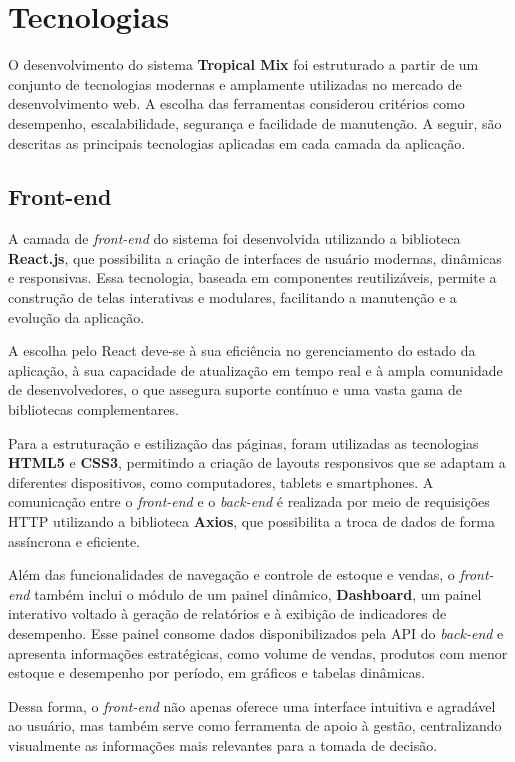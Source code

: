 \section{Tecnologias}

O desenvolvimento do sistema \textbf{Tropical Mix} foi estruturado a partir de um conjunto de tecnologias modernas e amplamente utilizadas no mercado de desenvolvimento web. A escolha das ferramentas considerou critérios como desempenho, escalabilidade, segurança e facilidade de manutenção. A seguir, são descritas as principais tecnologias aplicadas em cada camada da aplicação.

\subsection{Front-end}

A camada de \textit{front-end} do sistema foi desenvolvida utilizando a biblioteca \textbf{React.js}, que possibilita a criação de interfaces de usuário modernas, dinâmicas e responsivas. Essa tecnologia, baseada em componentes reutilizáveis, permite a construção de telas interativas e modulares, facilitando a manutenção e a evolução da aplicação.  

A escolha pelo React deve-se à sua eficiência no gerenciamento do estado da aplicação, à sua capacidade de atualização em tempo real e à ampla comunidade de desenvolvedores, o que assegura suporte contínuo e uma vasta gama de bibliotecas complementares.  

Para a estruturação e estilização das páginas, foram utilizadas as tecnologias \textbf{HTML5} e \textbf{CSS3}, permitindo a criação de layouts responsivos que se adaptam a diferentes dispositivos, como computadores, tablets e smartphones. A comunicação entre o \textit{front-end} e o \textit{back-end} é realizada por meio de requisições HTTP utilizando a biblioteca \textbf{Axios}, que possibilita a troca de dados de forma assíncrona e eficiente.  

Além das funcionalidades de navegação e controle de estoque e vendas, o \textit{front-end} também inclui o módulo de um painel dinâmico, \textbf{Dashboard}, um painel interativo voltado à geração de relatórios e à exibição de indicadores de desempenho. Esse painel consome dados disponibilizados pela API do \textit{back-end} e apresenta informações estratégicas, como volume de vendas, produtos com menor estoque e desempenho por período, em gráficos e tabelas dinâmicas.  

Dessa forma, o \textit{front-end} não apenas oferece uma interface intuitiva e agradável ao usuário, mas também serve como ferramenta de apoio à gestão, centralizando visualmente as informações mais relevantes para a tomada de decisão.

